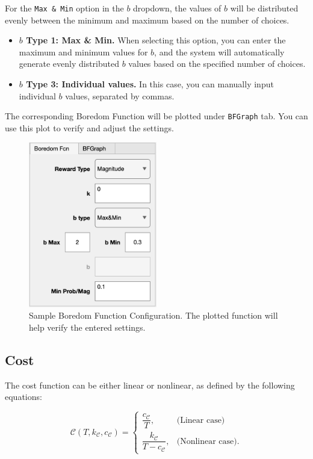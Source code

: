 For the \texttt{Max \& Min} option in the \(b\) dropdown, the values of \(b\) will be distributed evenly between the minimum and maximum based on the number of choices.  
\begin{itemize}
    \item \textbf{\(b\) Type 1: Max \& Min.} When selecting this option, you can enter the maximum and minimum values for \(b\), and the system will automatically generate evenly distributed \(b\) values based on the specified number of choices.
    \item \textbf{\(b\) Type 3: Individual values.} In this case, you can manually input individual \(b\) values, separated by commas.
\end{itemize}

The corresponding Boredom Function will be plotted under \texttt{BFGraph} tab. You can use this plot to verify and adjust the settings.

\begin{figure}[H]
    \centering
    \includegraphics[width=0.5\textwidth]{figs/boredom_function_example.png}
    \caption{Sample Boredom Function Configuration. The plotted function will help verify the entered settings.}
    \label{fig:boredom_function_example}
\end{figure}

\subsection{Cost}
The cost function can be either linear or nonlinear, as defined by the following equations:

\[
\mathcal{C}(T, k_\mathcal{C}, c_\mathcal{C}) = 
\begin{cases}
    \dfrac{c_\mathcal{C}}{T}, & \text{(Linear case)} \\[15pt]
    \dfrac{k_\mathcal{C}}{T - c_\mathcal{C}}, & \text{(Nonlinear case).}
\end{cases}
\]

